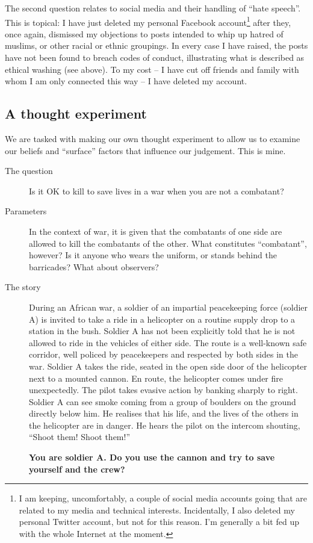 \documentclass[
]{book}
\begin{document}
The second question relates to social media and their handling of ``hate speech''. This is topical: I have just deleted my personal Facebook account\footnote{I am keeping, uncomfortably, a couple of social media accounts going that are related to my media and technical interests. Incidentally, I also deleted my personal Twitter account, but not for this reason. I'm generally a bit fed up with the whole Internet at the moment.} after they, once again, dismissed my objections to posts intended to whip up hatred of muslims, or other racial or ethnic groupings. In every case I have raised, the posts have not been found to breach codes of conduct, illustrating what is described as ethical washing (see above). To my cost -- I have cut off friends and family with whom I am only connected this way -- I have deleted my account.

\hypertarget{a-thought-experiment}{%
\subsection{A thought experiment}\label{a-thought-experiment}}

We are tasked with making our own thought experiment to allow us to examine our beliefs and ``surface'' factors that influence our judgement. This is mine.

\begin{description}
\item[The question]
Is it OK to kill to save lives in a war when you are not a combatant?
\item[Parameters]
In the context of war, it is given that the combatants of one side are allowed to kill the combatants of the other. What constitutes ``combatant'', however? Is it anyone who wears the uniform, or stands behind the barricades? What about observers?
\item[The story]
During an African war, a soldier of an impartial peacekeeping force (soldier A) is invited to take a ride in a helicopter on a routine supply drop to a station in the bush. Soldier A has not been explicitly told that he is not allowed to ride in the vehicles of either side. The route is a well-known safe corridor, well policed by peacekeepers and respected by both sides in the war. Soldier A takes the ride, seated in the open side door of the helicopter next to a mounted cannon. En route, the helicopter comes under fire unexpectedly. The pilot takes evasive action by banking sharply to right. Soldier A can see smoke coming from a group of boulders on the ground directly below him. He realises that his life, and the lives of the others in the helicopter are in danger. He hears the pilot on the intercom shouting, ``Shoot them! Shoot them!''

\textbf{You are soldier A. Do you use the cannon and try to save yourself and the crew?}
\end{description}
\end{document}
